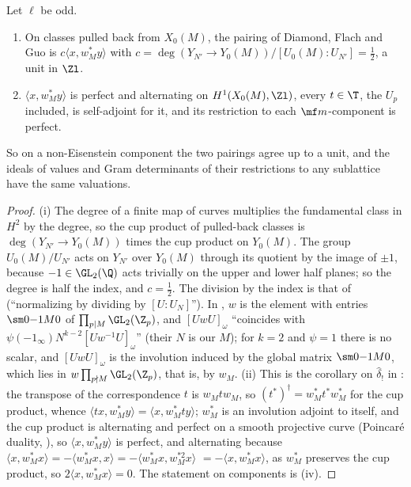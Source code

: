 \begin{proposition}\label{prop:congruence:dfg-pairing}
Let $\ell$ be odd.
\begin{enumerate}[label=(\roman*)]
\item On classes pulled back from $X_0(M)$, the pairing of Diamond, Flach and Guo is $c\langle x,w_M^*y\rangle$ with $c=\deg(Y_{N'}\to Y_0(M))/[U_0(M):U_{N'}]=\frac12$, a unit in $\Zl$.
\item $\langle x,w_M^*y\rangle$ is perfect and alternating on $H^1(X_0(M),\Zl)$, every $t\in\T$, the $U_p$ included, is self-adjoint for it, and its restriction to each $\mf m$-component is perfect.
\end{enumerate}
So on a non-Eisenstein component the two pairings agree up to a unit, and the ideals of values and Gram determinants of their restrictions to any sublattice have the same
valuations.
\end{proposition}

\begin{proof}
(i) The degree of a finite map of curves multiplies the fundamental class in $H^2$ by the degree, so the cup product of pulled-back classes is $\deg(Y_{N'}\to Y_0(M))$ times the
cup product on $Y_0(M)$. The group $U_0(M)/U_{N'}$ acts on $Y_{N'}$ over $Y_0(M)$ through its quotient by the image of $\pm1$, because $-1\in\GL_2(\Q)$ acts trivially on the upper and
lower half planes; so the degree is half the index, and $c=\frac12$. The division by the index is that of \cite[Section 1.5.2]{DFG04} (``normalizing by dividing by $[U:U_N]$''). In \cite[Section 1.5.3]{DFG04}, $w$ is the
element with entries $\sm0{-1}M0$ of $\prod_{p\mid M}\GL_2(\Z_p)$, and $[UwU]_\omega$ ``coincides with $\psi(-1_\infty)N^{k-2}[Uw^{-1}U]_\omega$'' (their $N$ is our $M$); for $k=2$ and $\psi=1$
there is no scalar, and $[UwU]_\omega$ is the involution induced by the global matrix $\sm0{-1}M0$, which lies in $w\prod_{p\nmid M}\GL_2(\Z_p)$, that is, by $w_M$. (ii) This is the corollary on $\hat\delta_!$ in : the transpose of the correspondence $t$ is $w_Mtw_M$,
so $(t^*)^\dagger=w_M^*t^*w_M^*$ for the cup product, whence $\langle tx,w_M^*y\rangle=\langle x,w_M^*ty\rangle$; $w_M^*$ is an involution adjoint to itself, and the cup product is alternating and perfect
on a smooth projective curve (Poincar\'e duality, ), so $\langle x,w_M^*y\rangle$ is perfect, and alternating because $\langle x,w_M^*x\rangle=-\langle w_M^*x,x\rangle=-\langle w_M^*x,w_M^{*2}x\rangle$ $=-\langle x,w_M^*x\rangle$, as $w_M^*$
preserves the cup product, so $2\langle x,w_M^*x\rangle=0$. The statement on components is (iv).
\end{proof}


